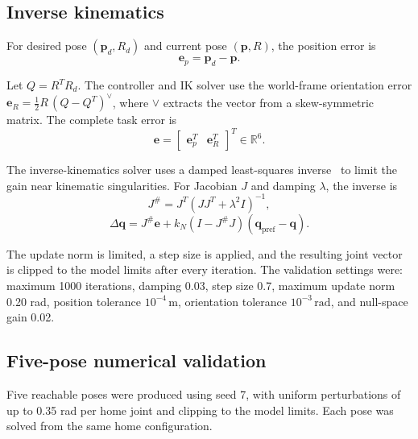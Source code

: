 \documentclass[12pt,a4paper]{article}
\begin{document}
\subsection{Inverse kinematics}

For desired pose $(\bm p_d,R_d)$ and current pose $(\bm p,R)$, the position error is
\begin{equation}
\bm e_p=\bm p_d-\bm p.
\end{equation}



Let $Q=R^TR_d$. The controller and IK solver use the world-frame orientation error $\bm e_R=\tfrac12 R\,(Q-Q^T)^\vee$, where $\vee$ extracts the vector from a skew-symmetric matrix. The complete task error is
\begin{equation}
\bm e=\begin{bmatrix}\bm e_p^T & \bm e_R^T\end{bmatrix}^T\in\mathbb{R}^6.
\end{equation}


The inverse-kinematics solver uses a damped least-squares inverse~\cite{wampler1986} to limit the gain near kinematic singularities. For Jacobian $J$ and damping $\lambda$, the inverse is
\begin{equation}
J^{\#}=J^T\left(JJ^T+\lambda^2I\right)^{-1},
\end{equation}
\begin{equation}
\Delta\bm q=J^{\#}\bm e+k_N\left(I-J^{\#}J\right)(\bm q_{\mathrm{pref}}-\bm q).
\end{equation}

The update norm is limited, a step size is applied, and the resulting joint vector is clipped to the model limits after every iteration. The validation settings were: maximum 1000 iterations, damping 0.03, step size 0.7, maximum update norm 0.20 rad, position tolerance $10^{-4}\,\mathrm{m}$, orientation tolerance $10^{-3}\,\mathrm{rad}$, and null-space gain 0.02.

\subsection{Five-pose numerical validation}
Five reachable poses were produced using seed 7, with uniform perturbations of up to 0.35 rad per home joint and clipping to the model limits. Each pose was solved from the same home configuration.
\end{document}
